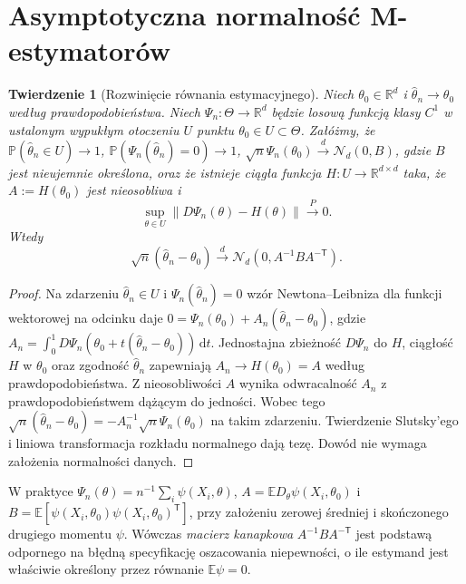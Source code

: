 \documentclass[11pt,a4paper,oneside]{report}
\numberwithin{equation}{chapter}
\theoremstyle{plain}
\newtheorem{twierdzenie}{Twierdzenie}[chapter]
\theoremstyle{definition}
\theoremstyle{remark}
\newcommand{\R}{\mathbb R}
\newcommand{\Prob}{\mathbb P}
\newcommand{\E}{\mathbb E}
\newcommand{\dd}{\mathrm d}
\newcommand{\Normal}{\mathcal N}
\begin{document}
\section{Asymptotyczna normalność M-estymatorów}
\begin{twierdzenie}[Rozwinięcie równania estymacyjnego]
\label{thm:m-est-normality}
Niech $\theta_0\in\R^d$ i $\widehat\theta_n\to\theta_0$
według prawdopodobieństwa. Niech $\Psi_n:\Theta\to\R^d$
będzie losową funkcją klasy $C^1$ w ustalonym wypukłym otoczeniu
$U$ punktu $\theta_0\in U\subset\Theta$. Załóżmy, że
$\Prob(\widehat\theta_n\in U)\to1$,
$\Prob(\Psi_n(\widehat\theta_n)=0)\to1$,
$\sqrt n\Psi_n(\theta_0)\xrightarrow{d}\Normal_d(0,B)$,
gdzie $B$ jest nieujemnie określona, oraz że istnieje
ciągła funkcja $H:U\to\R^{d\times d}$ taka, że
$A:=H(\theta_0)$ jest nieosobliwa i
\[
\sup_{\theta\in U}\|D\Psi_n(\theta)-H(\theta)\|
\xrightarrow{P}0.
\]
Wtedy
\[
\sqrt n(\widehat\theta_n-\theta_0)
\xrightarrow{d}\Normal_d(0,A^{-1}B A^{-\mathsf T}).
\]
\end{twierdzenie}
\begin{proof}
Na zdarzeniu $\widehat\theta_n\in U$ i
$\Psi_n(\widehat\theta_n)=0$ wzór Newtona--Leibniza dla
funkcji wektorowej na odcinku daje
$0=\Psi_n(\theta_0)+A_n(\widehat\theta_n-\theta_0)$,
gdzie $A_n=\int_0^1D\Psi_n(\theta_0+t(\widehat\theta_n-
\theta_0))\,\dd t$.
Jednostajna zbieżność $D\Psi_n$ do $H$, ciągłość $H$ w
$\theta_0$ oraz zgodność $\widehat\theta_n$ zapewniają
$A_n\to H(\theta_0)=A$ według prawdopodobieństwa.
Z nieosobliwości $A$ wynika odwracalność
$A_n$ z prawdopodobieństwem dążącym do jedności.
Wobec tego $\sqrt n(\widehat\theta_n-\theta_0)
=-A_n^{-1}\sqrt n\Psi_n(\theta_0)$ na takim zdarzeniu.
Twierdzenie Slutsky'ego i liniowa transformacja rozkładu normalnego
dają tezę. Dowód nie wymaga założenia normalności danych.
\end{proof}

W praktyce $\Psi_n(\theta)=n^{-1}\sum_i\psi(X_i,\theta)$,
$A=\E D_\theta\psi(X_i,\theta_0)$ i
$B=\E[\psi(X_i,\theta_0)\psi(X_i,\theta_0)^{\mathsf T}]$,
przy założeniu zerowej średniej i skończonego drugiego momentu
$\psi$. Wówczas \emph{macierz kanapkowa}
$A^{-1}BA^{-\mathsf T}$ jest podstawą odpornego na błędną
specyfikację oszacowania niepewności, o ile estymand jest
właściwie określony przez równanie $\E\psi=0$.
\end{document}
